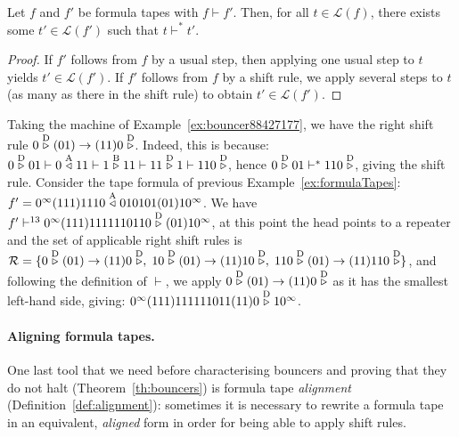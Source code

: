 \begin{lemma}\label{lem:vdashFormulaTapes} Let $f$ and $f'$ be formula tapes with $f \vdash f'$. Then, for all $t \in \mathcal{L}(f)$, there exists some $t' \in \mathcal{L}(f')$ such that $t \vdash^* t'$.
\end{lemma}
\begin{proof}
    If $f'$ follows from $f$ by a usual step, then applying one usual step to $t$ yields $t'\in\mathcal{L}(f')$. If $f'$ follows from $f$ by a shift rule, we apply several steps to $t$ (as many as there in the shift rule) to obtain $t' \in \mathcal{L}(f')$.
\end{proof}


\begin{example}\label{ex:shiftRules}
    Taking the machine of Example~\ref{ex:bouncer88427177}, we have the right shift rule $0 \stackrel{\text{D}}\triangleright(01) \to (11)0\stackrel{\text{D}}\triangleright$. Indeed, this is because: $0 \stackrel{\text{D}}\triangleright01 \vdash 0\stackrel{\text{A}}\triangleleft11 \vdash 1\stackrel{\text{B}}\triangleright11 \vdash 11\stackrel{\text{D}}\triangleright1 \vdash 110\stackrel{\text{D}}\triangleright$, hence $0 \stackrel{\text{D}}\triangleright01 \vdash^* 110\stackrel{\text{D}}\triangleright$, giving the shift rule. Consider the tape formula of previous Example~\ref{ex:formulaTapes}: $f' = 0^\infty(111)1110 \stackrel{\text{A}}\triangleleft 010101(01)10^\infty$. We have $f' \vdash^{13} 0^\infty (111)1111110110 \stackrel{\text{D}}\triangleright (01) 10^\infty$, at this point the head points to a repeater and the set of applicable right shift rules is $\mathcal{R} = \{ 0 \stackrel{\text{D}}\triangleright(01) \to (11)0\stackrel{\text{D}}\triangleright,\; 10 \stackrel{\text{D}}\triangleright(01) \to (11)10\stackrel{\text{D}}\triangleright,\; 110 \stackrel{\text{D}}\triangleright(01) \to (11)110\stackrel{\text{D}}\triangleright\}$, and following the definition of $\vdash$, we apply $0 \stackrel{\text{D}}\triangleright(01) \to (11)0\stackrel{\text{D}}\triangleright$ as it has the smallest left-hand side, giving: $0^\infty (111)111111011(11)0 \stackrel{\text{D}}\triangleright 10^\infty$.

\end{example}

\paragraph*{Aligning formula tapes.} One last tool that we need before characterising bouncers and proving that they do not halt (Theorem~\ref{th:bouncers}) is formula tape \textit{alignment} (Definition~\ref{def:alignment}): sometimes it is necessary to rewrite a formula tape in an equivalent, \textit{aligned} form in order for being able to apply shift rules.

